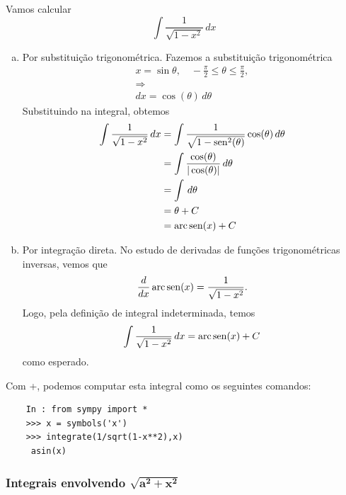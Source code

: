 \begin{ex}
  Vamos calcular
  \begin{equation}
    \int \frac{1}{\sqrt{1 - x^2}}\,dx
  \end{equation}
  \begin{enumerate}[a)]
  \item Por substituição trigonométrica.
    Fazemos a substituição trigonométrica
    \begin{gather}
      x = \sin\theta,\quad -\frac{\pi}{2}\leq\theta\leq\frac{\pi}{2},\\
      \Rightarrow\\
      dx = \cos(\theta)\,d\theta
    \end{gather}
    Substituindo na integral, obtemos
    \begin{align}
      \int \frac{1}{\sqrt{1 - x^2}}\,dx &= \int \frac{1}{\sqrt{1 - \operatorname{sen}^2(\theta)}}\cos(\theta)\,d\theta\\
                                        &= \int \frac{\cos(\theta)}{|\cos(\theta)|}\,d\theta\\
                                        &= \int\,d\theta\\
                                        &= \theta + C\\
                                        &= \operatorname{arc}\operatorname{sen}(x) + C
    \end{align}
  \item Por integração direta.
    No estudo de derivadas de funções trigonométricas inversas, vemos que
    \begin{equation}
      \frac{d}{dx}\operatorname{arc}\operatorname{sen}(x) = \frac{1}{\sqrt{1-x^2}}.
    \end{equation}
    Logo, pela definição de integral indeterminada, temos
    \begin{equation}
      \int\frac{1}{\sqrt{1-x^2}}\,dx = \operatorname{arc}\operatorname{sen}(x) + C
    \end{equation}
    como esperado.
  \end{enumerate}

  \ifispython
  Com {\python}+{\sympy}, podemos computar esta integral como os seguintes comandos:
  \begin{lstlisting}
    In : from sympy import *
    >>> x = symbols('x')
    >>> integrate(1/sqrt(1-x**2),x)
     asin(x)
  \end{lstlisting}
  \fi
\end{ex}

\subsubsection{Integrais envolvendo $\pmb{\sqrt{a^2 + x^2}}$}

